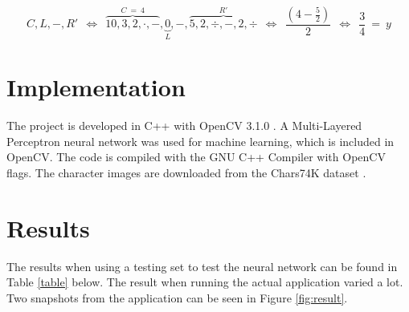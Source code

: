 \documentclass[12pt]{report}
\begin{document}
\begin{equation}
  \label{eq:3}
  C,L,-,R' \ \ \iff \ \  \overbrace{10,3,2,\cdot,-}^{C \ = \ 4},\underbrace{0}_{L},-,\overbrace{5,2,\div,-,2,\div}^{R'} \ \ \iff \ \ \frac{(4-\frac{5}{2})}{2} \ \ \iff \ \ \frac{3}{4} \ = \ y
\end{equation}


\section*{Implementation}

The project is developed in C++ with OpenCV 3.1.0 \cite{opencv}. A Multi-Layered Perceptron neural network was used for machine learning, which is included in OpenCV.  The code is compiled with the GNU C++ Compiler with OpenCV flags.  The character images are downloaded from the Chars74K dataset \cite{dataset}.


\section*{Results}

The results when using a testing set to test the neural network can be found in Table \ref{table} below. The result when running the actual application varied a lot. Two snapshots from the application can be seen in Figure \ref{fig:result}.
\end{document}
